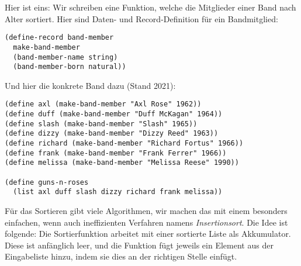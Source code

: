 Hier ist eins: Wir schreiben eine Funktion, welche die Mitglieder
einer Band nach Alter sortiert.  Hier sind Daten- und
Record-Definition für ein Bandmitglied:
%
\begin{lstlisting}
(define-record band-member
  make-band-member
  (band-member-name string)
  (band-member-born natural))
\end{lstlisting}
%
Und hier die konkrete Band dazu (Stand 2021):
%
\begin{lstlisting}
(define axl (make-band-member "Axl Rose" 1962))
(define duff (make-band-member "Duff McKagan" 1964))
(define slash (make-band-member "Slash" 1965))
(define dizzy (make-band-member "Dizzy Reed" 1963))
(define richard (make-band-member "Richard Fortus" 1966))
(define frank (make-band-member "Frank Ferrer" 1966))
(define melissa (make-band-member "Melissa Reese" 1990))

(define guns-n-roses
  (list axl duff slash dizzy richard frank melissa))
\end{lstlisting}
%
Für das Sortieren gibt viele Algorithmen, wir machen das mit einem
besonders einfachen, wenn auch ineffizienten Verfahren namens
\textit{Insertionsort}.  Die Idee ist folgende:
Die Sortierfunktion arbeitet mit einer sortierte Liste als
Akkumulator.  Diese ist anfänglich leer, und die Funktion fügt jeweils
ein Element aus der Eingabeliste hinzu, indem sie dies an der
richtigen Stelle einfügt.


